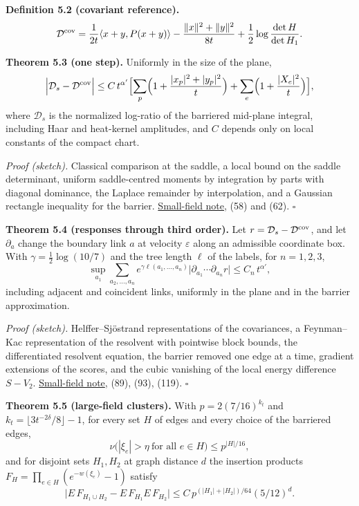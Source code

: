 \documentclass[11pt,a4paper]{article}
\begin{document}
\textbf{Definition 5.2 (covariant reference).}
\[\mathcal D^{\rm cov}=\frac1{2t}\langle x+y,P(x+y)\rangle-\frac{\|x\|^2+\|y\|^2}{8t}
+\frac12\log\frac{\det H}{\det H_1}.\]

\textbf{Theorem 5.3 (one step).} Uniformly in the size of the plane,
\[\Bigl|\mathcal D_s-\mathcal D^{\rm cov}\Bigr|\le C\,t^{\alpha'}\Bigl[\sum_p\Bigl(1+\frac{|x_p|^2+|y_p|^2}t\Bigr)
+\sum_e\Bigl(1+\frac{|X_e|^2}t\Bigr)\Bigr],\] where \(\mathcal D_s\) is
the normalized log-ratio of the barriered mid-plane integral, including
Haar and heat-kernel amplitudes, and \(C\) depends only on local
constants of the compact chart.

\emph{Proof (sketch).} Classical comparison at the saddle, a local bound
on the saddle determinant, uniform saddle-centred moments by integration
by parts with diagonal dominance, the Laplace remainder by
interpolation, and a Gaussian rectangle inequality for the barrier.
\href{su2-midplane-small-field.md}{Small-field note}, (58) and (62).
\(\square\)

\textbf{Theorem 5.4 (responses through third order).} Let
\(r=\mathcal D_s-\mathcal D^{\rm cov}\), and let \(\partial_a\) change
the boundary link \(a\) at velocity \(\varepsilon\) along an admissible
coordinate box. With \(\gamma=\frac12\log(10/7)\) and the tree length
\(\ell\) of the labels, for \(n=1,2,3\),
\[\sup_{a_1}\sum_{a_2,\dots,a_n}e^{\gamma\ell(a_1,\dots,a_n)}\bigl|\partial_{a_1}\cdots\partial_{a_n}r\bigr|\le C_n\,t^{\alpha'},\]
including adjacent and coincident links, uniformly in the plane and in
the barrier approximation.

\emph{Proof (sketch).} Helffer--Sjöstrand representations of the
covariances, a Feynman--Kac representation of the resolvent with
pointwise block bounds, the differentiated resolvent equation, the
barrier removed one edge at a time, gradient extensions of the scores,
and the cubic vanishing of the local energy difference \(S-V_2\).
\href{su2-midplane-small-field.md}{Small-field note}, (89), (93), (119).
\(\square\)

\textbf{Theorem 5.5 (large-field clusters).} With \(p=2(7/16)^{k_t}\)
and \(k_t=\lfloor3t^{-2\delta}/8\rfloor-1\), for every set \(H\) of
edges and every choice of the barriered edges,
\[\nu\bigl(|\xi_e|>\eta\ \text{for all }e\in H\bigr)\le p^{|H|/16},\]
and for disjoint sets \(H_1,H_2\) at graph distance \(d\) the insertion
products \(F_H=\prod_{e\in H}(e^{-w(\xi_e)}-1)\) satisfy
\[\bigl|E\,F_{H_1\cup H_2}-E\,F_{H_1}E\,F_{H_2}\bigr|\le C\,p^{(|H_1|+|H_2|)/64}(5/12)^d .\]
\end{document}
